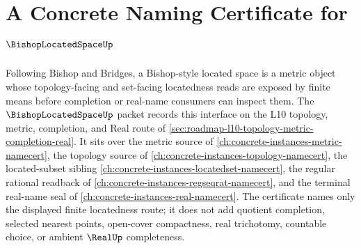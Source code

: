 \chapter{A Concrete Naming Certificate for $\BishopLocatedSpaceUp$}
\label{ch:concrete-instances-bishop-located-space-namecert}

Following Bishop and Bridges, a Bishop-style located space is a metric object whose topology-facing and set-facing locatedness reads are exposed by finite means before completion or real-name consumers can inspect them. The $\BishopLocatedSpaceUp$ packet records this interface on the L10 topology, metric, completion, and Real route of \autoref{sec:roadmap-l10-topology-metric-completion-real}. It sits over the metric source of \autoref{ch:concrete-instances-metric-namecert}, the topology source of \autoref{ch:concrete-instances-topology-namecert}, the located-subset sibling \autoref{ch:concrete-instances-locatedset-namecert}, the regular rational readback of \autoref{ch:concrete-instances-regseqrat-namecert}, and the terminal real-name seal of \autoref{ch:concrete-instances-real-namecert}. The certificate names only the displayed finite locatedness route; it does not add quotient completion, selected nearest points, open-cover compactness, real trichotomy, countable choice, or ambient $\RealUp$ completeness.

